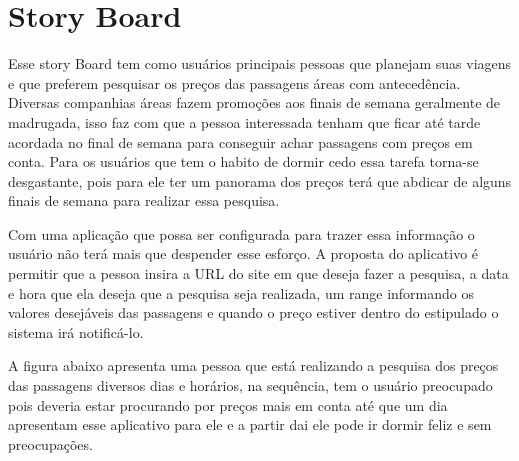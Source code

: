 \chapter[Story Board]{Story Board}

Esse story Board tem como  usuários principais pessoas que planejam suas viagens e que preferem pesquisar os preços das passagens áreas com antecedência. Diversas companhias áreas fazem promoções aos finais de semana geralmente de madrugada, isso faz com que a pessoa interessada tenham que ficar até tarde acordada no final de semana para conseguir achar passagens com preços em conta. Para os usuários que tem o habito de dormir cedo essa tarefa torna-se desgastante, pois para ele ter um panorama dos preços terá que abdicar de alguns finais de semana para realizar essa pesquisa. 

Com uma aplicação que possa ser configurada para trazer essa informação o usuário não terá mais que  despender esse esforço. A proposta do aplicativo é permitir que a pessoa insira a URL do site em que deseja fazer a pesquisa, a data e hora que ela deseja que a pesquisa seja realizada, um range informando os valores desejáveis das passagens e quando o preço estiver dentro do estipulado o sistema irá notificá-lo. 

A figura abaixo apresenta uma pessoa que está realizando a pesquisa dos preços das passagens diversos  dias e horários, na sequência, tem o usuário preocupado pois deveria estar procurando por preços mais em conta até que um dia apresentam esse aplicativo para ele e a partir dai ele pode ir dormir feliz e sem preocupações.


